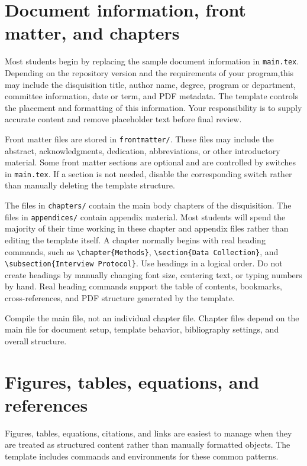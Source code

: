 \section{Document information, front matter, and chapters}
\label{sec:document-information}

Most students begin by replacing the sample document information in \texttt{main.tex}. Depending on the repository version and the requirements of your program,this may include the disquisition title, author name, degree, program or department, committee information, date or term, and PDF metadata. The template controls the placement and formatting of this information. Your responsibility is to supply accurate content and remove placeholder text before final review.

Front matter files are stored in \texttt{frontmatter/}. These files may include the abstract, acknowledgments, dedication, abbreviations, or other introductory material. Some front matter sections are optional and are controlled by switches in \texttt{main.tex}. If a section is not needed, disable the corresponding switch rather than manually deleting the template structure.

The files in \texttt{chapters/} contain the main body chapters of the disquisition. The files in \texttt{appendices/} contain appendix material. Most students will spend the majority of their time working in these chapter and appendix files rather than editing the template itself. A chapter normally begins with real heading commands, such as \texttt{\textbackslash chapter\{Methods\}}, \texttt{\textbackslash section\{Data Collection\}}, and \texttt{\textbackslash subsection\{Interview Protocol\}}.
Use headings in a logical order. Do not create headings by manually changing font size, centering text, or typing numbers by hand. Real heading commands support the table of contents, bookmarks, cross-references, and PDF structure generated by the template.

Compile the main file, not an individual chapter file. Chapter files depend on the main file for document setup, template behavior, bibliography settings, and overall structure.

\section{Figures, tables, equations, and references}
\label{sec:common-content}

Figures, tables, equations, citations, and links are easiest to manage when they are treated as structured content rather than manually formatted objects. The template includes commands and environments for these common patterns.

